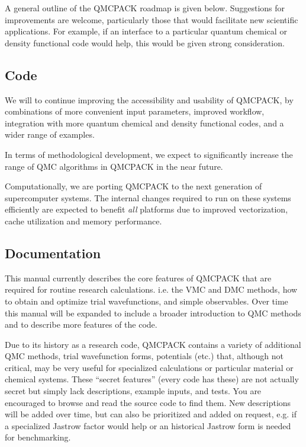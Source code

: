 A general outline of the QMCPACK roadmap is given below. Suggestions
for improvements are welcome, particularly those that would facilitate new
scientific applications. For example, if an interface to a particular
quantum chemical or density functional code would help, this would be
given strong consideration.

\subsection{Code}

We will to continue improving the accessibility and usability of
QMCPACK, by combinations of more convenient input parameters, improved
workflow, integration with more quantum chemical and density
functional codes, and a wider range of examples.

In terms of methodological development, we expect to significantly
increase the range of QMC algorithms in QMCPACK in the near future.

Computationally, we are porting QMCPACK to the next generation of
supercomputer systems. The internal changes required to run on these
systems efficiently are expected to benefit \emph{all} platforms due
to improved vectorization, cache utilization and memory performance.

\subsection{Documentation}

This manual currently describes the core features of QMCPACK that are
required for routine research calculations. i.e. the VMC and DMC
methods, how to obtain and optimize trial wavefunctions, and simple
observables. Over time this manual will be expanded to include a
broader introduction to QMC methods and to describe more features of
the code.

Due to its history as a research code, QMCPACK contains a variety of
additional QMC methods, trial wavefunction forms, potentials (etc.)
that, although not critical, may be very useful for specialized
calculations or particular material or chemical systems. These
``secret features'' (every code has these) are not actually secret but
simply lack descriptions, example inputs, and tests. You are
encouraged to browse and read the source code to find them. New
descriptions will be added over time, but can also be prioritized and
added on request, e.g. if a specialized Jastrow factor would help or
an historical Jastrow form is needed for benchmarking.



